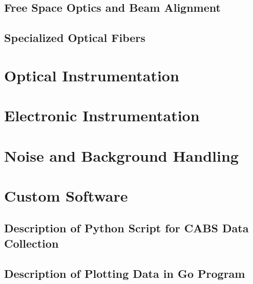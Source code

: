   \subsection{Free Space Optics and Beam Alignment}
  \label{subsec:Experimental:Techniques:Alignment}
  \lipsum[1]

  \subsection{Specialized Optical Fibers}
  \label{subsec:Experimental:Techniques:Fibers}
  \lipsum[1]

\section{Optical Instrumentation}
\label{sec:Experimental:Optical Instrumentation}
\lipsum[1]

\section{Electronic Instrumentation}
\label{sec:Experimental:Electronic Instrumentation}
\lipsum[1]

\section{Noise and Background Handling}
\label{sec:Experimental:Noise}
\lipsum[1]

\section{Custom Software}
\label{sec:Experimental:Software}
\lipsum[1]

  \subsection{Description of Python Script for CABS Data Collection}
  \label{subsec:Experimental:Software:Python}
  \lipsum[1]

  \subsection{Description of Plotting Data in Go Program}
  \label{subsec:Experimental:Software:Go}
  \lipsum[1]
